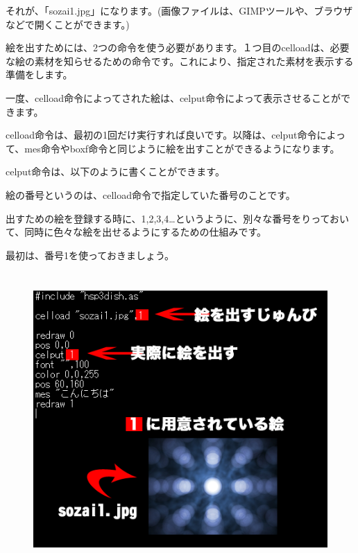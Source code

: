 それが、「sozai1.jpg」になります。(画像ファイルは、GIMPツールや、ブラウザなどで開くことができます。)


絵を出すためには、2つの命令を使う必要があります。１つ目のcelloadは、必要な絵の素材を知らせるための命令です。これにより、指定された素材を表示する準備をします。

\begin{description}
    \item {}
\end{description}


一度、celload命令によってされた絵は、celput命令によって表示させることができます。

celload命令は、最初の1回だけ実行すれば良いです。以降は、celput命令によって、mes命令やboxf命令と同じように絵を出すことができるようになります。


celput命令は、以下のように書くことができます。




\begin{description}
    \item {}
\end{description}



絵の番号というのは、celload命令で指定していた番号のことです。

出すための絵を登録する時に、1,2,3,4…というように、別々な番号をりっておいて、同時に色々な絵を出せるようにするための仕組みです。

最初は、番号1を使っておきましょう。


\begin{figure}[H]
    \begin{center}
      \includegraphics[keepaspectratio,width=12.806cm,height=11.206cm]{text04-img/text04-img013.png}
    \end{center}
    \label{fig:prog_menu}
\end{figure}


